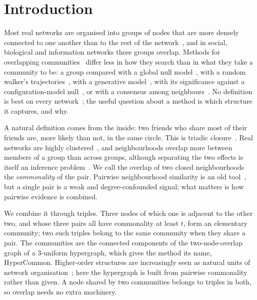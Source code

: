 \section{Introduction}
\label{sec:intro}

Most real networks are organised into groups of nodes that are more densely connected to
one another than to the rest of the
network~\cite{fortunato2010community,fortunato2022twenty},
and in social, biological and information networks these groups overlap. Methods for
overlapping communities~\cite{xie2013overlapping,fortunato2016community} differ less in
how they search than in what they take a community to be: a group compared with a global
null model~\cite{newman2004finding,traag2019leiden}, with a random
walker's trajectories~\cite{rosvall2008maps}, with a generative
model~\cite{peixoto2014hierarchical,ball2011efficient},
with its significance against a configuration-model null~\cite{lancichinetti2011finding},
or with a consensus among neighbours~\cite{raghavan2007near,gregory2010finding,xie2011slpa}.
No definition is best on every network~\cite{peel2017ground,ghasemian2020evaluating}; the
useful question about a method is which structure it captures, and why.

A natural definition comes from the inside: two friends who share most of their friends
are, more likely than not, in the same circle. This is triadic
closure~\cite{granovetter1973strength}. Real networks are highly
clustered~\cite{watts1998collective}, and neighbourhoods overlap more between members of
a group than across groups, although separating the two effects is itself an inference
problem~\cite{peixoto2022disentangling}. We call the overlap of two closed neighbourhoods
the \emph{commonality} of the pair. Pairwise neighbourhood similarity is an old
tool~\cite{jaccard1912distribution,leicht2006vertex,zhou2009predicting,barzel2013network,feizi2013network},
but a single pair is a weak and degree-confounded signal; what matters is how pairwise
evidence is combined.

We combine it through triples. Three nodes of which one is adjacent to the other two,
and whose three pairs all have commonality at least $t$, form an elementary community;
two such triples belong to the same community when they share a pair. The communities
are the connected components of the two-node-overlap graph of a 3-uniform hypergraph,
which gives the method its name, HyperCommon. Higher-order structures are increasingly
seen as natural units of network
organisation~\cite{benson2016higher,battiston2020networks};
here the hypergraph is built from pairwise commonality rather than given. A node shared
by two communities belongs to triples in both, so overlap needs no extra machinery.

